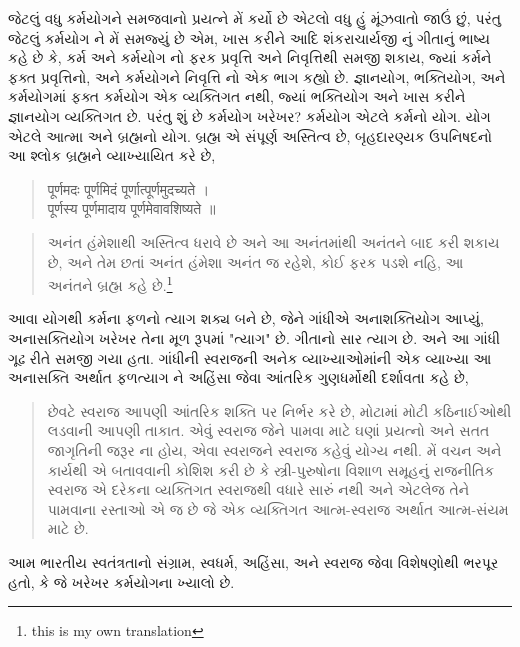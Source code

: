 \documentclass[a4paper]{article}
\begin{document}
\begin{Guja}
જેટલું વધુ કર્મયોગને સમજવાનો પ્રયત્ને મેં કર્યો છે એટલો વધુ હું મૂંઝવાતો જાઉં છું, પરંતુ જેટલું કર્મયોગ ને મેં સમજ્યું છે એમ, ખાસ કરીને આદિ શંકરાચાર્યજી નું ગીતાનું ભાષ્ય કહે છે કે, કર્મ અને કર્મયોગ નો ફરક 
પ્રવૃત્તિ અને નિવૃત્તિથી સમજી શકાય, જ્યાં કર્મને ફક્ત પ્રવૃત્તિનો, અને કર્મયોગને નિવૃત્તિ નો એક ભાગ કહ્યો છે. જ્ઞાનયોગ, ભક્તિયોગ, અને કર્મયોગમાં ફક્ત કર્મયોગ એક વ્યક્તિગત નથી, જ્યાં ભક્તિયોગ અને ખાસ 
કરીને જ્ઞાનયોગ વ્યક્તિગત છે. પરંતુ શું છે કર્મયોગ ખરેખર? 
કર્મયોગ એટલે કર્મનો યોગ. યોગ એટલે આત્મા અને બ્રહ્મનો યોગ. બ્રહ્મ એ સંપૂર્ણ અસ્તિત્વ છે, બૃહદારણ્યક ઉપનિષદનો આ શ્લોક બ્રહ્મને વ્યાખ્યાયિત કરે છે,
\begin{quote}
    \begin{sanskrit}
        पूर्णमदः पूर्णमिदं पूर्णात्पूर्णमुदच्यते ।
    \\ पूर्णस्य पूर्णमादाय पूर्णमेवावशिष्यते ॥
    \end{sanskrit}
\end{quote}
\begin{quote}
    \begin{Guja}
        અનંત હંમેશાથી અસ્તિત્વ ધરાવે છે અને આ અનંતમાંથી અનંતને બાદ કરી શકાય છે, અને તેમ છતાં અનંત હંમેશા અનંત જ રહેશે, કોઈ ફરક પડશે નહિ, આ અનંતને બ્રહ્મ કહે છે.\footnote{this is my own translation}
    \end{Guja}
\end{quote}
આવા યોગથી કર્મના ફળનો ત્યાગ શક્ય બને છે, જેને ગાંધીએ અનાશક્તિયોગ આપ્યું, અનાસક્તિયોગ ખરેખર તેના મૂળ રૂપમાં "ત્યાગ" છે. ગીતાનો સાર ત્યાગ છે. 
અને આ ગાંધી ગૂઢ રીતે સમજી ગયા હતા. ગાંધીની સ્વરાજની અનેક વ્યાખ્યાઓમાંની એક વ્યાખ્યા આ અનાસક્તિ અર્થાત ફળત્યાગ ને અહિંસા જેવા આંતરિક ગુણધર્મોથી 
દર્શાવતા કહે છે,
\begin{quote}
    \begin{Guja}
        છેવટે સ્વરાજ આપણી આંતરિક શક્તિ પર નિર્ભર કરે છે, મોટામાં મોટી કઠિનાઈઓથી લડવાની આપણી તાકાત. એવું સ્વરાજ જેને પામવા માટે ઘણાં પ્રયત્નો અને સતત જાગૃતિની જરૂર ના હોય, એવા સ્વરાજને સ્વરાજ કહેવું યોગ્ય નથી. મેં વચન અને કાર્યથી એ બતાવવાની કોશિશ કરી છે કે સ્ત્રી-પુરુષોના વિશાળ સમૂહનું રાજનીતિક સ્વરાજ એ દરેકના વ્યક્તિગત સ્વરાજથી વધારે સારું નથી અને એટલેજ તેને પામવાના રસ્તાઓ એ જ છે જે એક વ્યક્તિગત આત્મ-સ્વરાજ અર્થાત આત્મ-સંયમ માટે છે.
    \end{Guja}
\end{quote}
આમ ભારતીય સ્વતંત્રતાનો સંગ્રામ, સ્વધર્મ, અહિંસા, અને સ્વરાજ જેવા વિશેષણોથી ભરપૂર હતો, કે જે ખરેખર કર્મયોગના ખ્યાલો છે.

\end{Guja}
\end{document}
